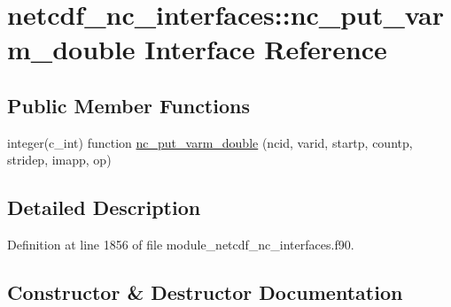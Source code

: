 \hypertarget{interfacenetcdf__nc__interfaces_1_1nc__put__varm__double}{}\section{netcdf\+\_\+nc\+\_\+interfaces\+:\+:nc\+\_\+put\+\_\+varm\+\_\+double Interface Reference}
\label{interfacenetcdf__nc__interfaces_1_1nc__put__varm__double}
\subsection*{Public Member Functions}
\begin{DoxyCompactItemize}
\item 
integer(c\+\_\+int) function \hyperlink{interfacenetcdf__nc__interfaces_1_1nc__put__varm__double_a05cf6a93c250ba1e3b270e822d0e95af}{nc\+\_\+put\+\_\+varm\+\_\+double} (ncid, varid, startp, countp, stridep, imapp, op)
\end{DoxyCompactItemize}


\subsection{Detailed Description}


Definition at line 1856 of file module\+\_\+netcdf\+\_\+nc\+\_\+interfaces.\+f90.



\subsection{Constructor \& Destructor Documentation}
\mbox{\label{interfacenetcdf__nc__interfaces_1_1nc__put__varm__double_a05cf6a93c250ba1e3b270e822d0e95af}} 
